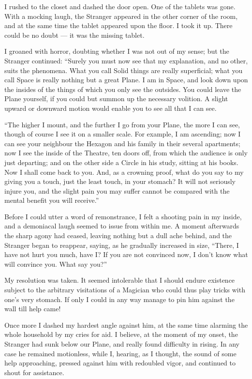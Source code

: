 \documentclass[12pt, a4paper, twoside]{memoir}
\begin{document}
I rushed to the closet and dashed the door open. One of the tablets was gone.
With a mocking laugh, the Stranger appeared in the other corner of the room,
and at the same time the tablet appeared upon the floor. I took it up. There
could be no doubt --- it was the missing tablet.

I groaned with horror, doubting whether I was not out of my sense; but the
Stranger continued: ``Surely you must now see that my explanation, and no
other, suits the phenomena. What you call Solid things are really superficial;
what you call Space is really nothing but a great Plane. I am in Space, and
look down upon the insides of the things of which you only see the outsides.
You could leave the Plane yourself, if you could but summon up the necessary
volition. A slight upward or downward motion would enable you to see all that
I can see.

``The higher I mount, and the further I go from your Plane, the more I can see,
though of course I see it on a smaller scale. For example, I am ascending; now
I can see your neighbour the Hexagon and his family in their several
apartments; now I see the inside of the Theatre, ten doors off, from which the
audience is only just departing; and on the other side a Circle in his study,
sitting at his books. Now I shall come back to you. And, as a crowning proof,
what do you say to my giving you a touch, just the least touch, in your
stomach? It will not seriously injure you, and the slight pain you may suffer
cannot be compared with the mental benefit you will receive.''

Before I could utter a word of remonstrance, I felt a shooting pain in my
inside, and a demoniacal laugh seemed to issue from within me. A moment
afterwards the sharp agony had ceased, leaving nothing but a dull ache behind,
and the Stranger began to reappear, saying, as he gradually increased in size,
``There, I have not hurt you much, have I? If you are not convinced now, I
don't know what will convince you. What say you?''

My resolution was taken. It seemed intolerable that I should endure existence
subject to the arbitrary visitations of a Magician who could thus play tricks
with one's very stomach. If only I could in any way manage to pin him against
the wall till help came!

Once more I dashed my hardest angle against him, at the same time alarming the
whole household by my cries for aid. I believe, at the moment of my onset, the
Stranger had sunk below our Plane, and really found difficulty in rising. In
any case he remained motionless, while I, hearing, as I thought, the sound of
some help approaching, pressed against him with redoubled vigor, and continued
to shout for assistance.
\end{document}
